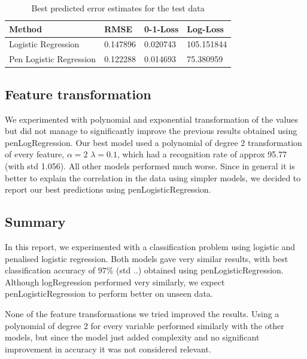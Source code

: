 \begin{table}[h!]
\begin{center}
    \begin{tabular}{ | l | l | l | p{5cm} |}
    \hline
    Method & RMSE & 0-1-Loss & Log-Loss \\ \hline
    Logistic Regression & 0.147896 & 0.020743 & 105.151844 \\ \hline
    Pen Logistic Regression & 0.122288 & 0.014693 & 75.380959 \\ \hline
    \end{tabular}
\end{center}
\caption{Best predicted error estimates for the test data}
\label{table:test_errors}
\end{table}
 

\subsection{Feature transformation}
We experimented with polynomial and exponential transformation of the values but did not manage to significantly improve the previous results obtained using penLogRegression. Our best model used a polynomial of degree 2 transformation of every feature, $\alpha=2$ $\lambda=0.1$, which had a recognition rate of approx 95.77 (with std 1.056). All other models performed much worse.
Since in general it is better to explain the correlation in the data using simpler models, we decided to report our best predictions using penLogisticRegression.

\subsection{Summary}

In this report, we experimented with a classification problem using logistic and penalised logistic regression. Both models gave very similar results, with best classification accuracy of  $97\%$ (std ..) obtained using penLogisticRegression. Although logRegression performed very similarly, we expect penLogisticRegression to perform better on unseen data.

None of the feature transformations we tried improved the results. Using a polynomial of degree 2 for every variable performed similarly with the other models, but since the model just added complexity and no significant improvement in accuracy it was not considered relevant.